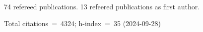 74 refereed publications. 13 refeered publications as first author.

Total citations~=~4324; h-index~=~35 (2024-09-28)